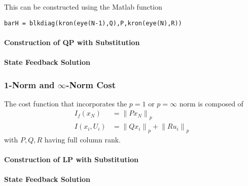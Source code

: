 This can be constructed using the Matlab function

\begin{small}
    \texttt{barH = blkdiag(kron(eye(N-1),Q),P,kron(eye(N),R))}
\end{small}

\paragraph{Construction of QP with Substitution}

\paragraph{State Feedback Solution}

\subsubsection[1-Norm and Inf-Norm Cost]{1-Norm and $\infty$-Norm Cost}

The cost function that incorporates the $p=1$ or $p=\infty$ norm is composed of
\begin{align*}
    I_f(x_N)   & = {\lVert Px_N \rVert}_p                          \\
    I(x_i,U_i) & = {\lVert Qx_i \rVert}_p + {\lVert Ru_i \rVert}_p
\end{align*}
with $P,Q,R$ having full column rank.

\paragraph{Construction of LP with Substitution}

\paragraph{State Feedback Solution}